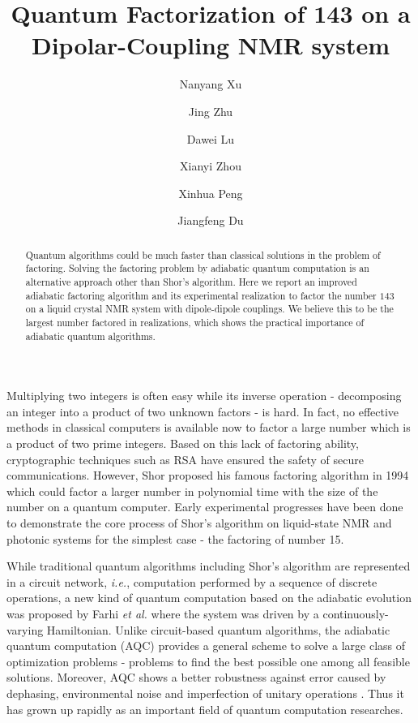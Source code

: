 \documentclass[twocolumn,showpacs,twoside,10pt,prl]{revtex4}
\begin{document}
\title{Quantum Factorization of 143 on a Dipolar-Coupling NMR system}
\author{Nanyang Xu}
\author{Jing Zhu}
\author{Dawei Lu}
\author{Xianyi Zhou}
\author{Xinhua Peng}
\author{Jiangfeng Du}
\begin{abstract}




Quantum algorithms could be much faster than classical solutions in
the problem of factoring. Solving the factoring problem by adiabatic
quantum computation is an alternative approach other than Shor's algorithm.
Here we report an improved adiabatic factoring algorithm and its
experimental realization to factor the number $143$ on a liquid
crystal NMR system with dipole-dipole couplings. We believe this to be the
largest number factored in realizations, which shows the practical
importance of adiabatic quantum algorithms.







\end{abstract}

\maketitle



Multiplying two integers is often easy while its inverse operation -
decomposing an integer into a product of two unknown factors - is
hard. In fact, no effective methods in classical computers is
available now to factor a large number which is a product of two
prime integers\cite{Knuth}. Based on this lack of factoring ability,
cryptographic techniques such as RSA have ensured the safety of
secure communications\cite{Koblitz}. However, Shor proposed his
famous factoring algorithm\cite{Shor_algorithm} in 1994 which could
factor a larger number in polynomial time with the size of the
number on a quantum computer. Early experimental progresses have been
done to demonstrate the core process of Shor's algorithm on liquid-state
NMR\cite{Chuang} and photonic systems\cite{Luchaoyang,Lanyon} for
the simplest case - the factoring of number 15.


While traditional quantum algorithms including Shor's algorithm are
represented in a circuit network, \emph{i.e.}, computation performed
by a sequence of discrete operations, a new kind of quantum
computation based on the adiabatic evolution was proposed by Farhi
\emph{et al.} \cite{Farhi} where the system was driven by a
continuously-varying Hamiltonian. Unlike circuit-based quantum algorithms, the adiabatic quantum
computation (AQC) provides a general scheme to solve a large class of
optimization problems - problems to find the best possible one
among all feasible solutions. Moreover, AQC shows a better robustness
against error caused by dephasing, environmental noise and
imperfection of unitary operations \cite{Childs_2002,Roland_robust}.
Thus it has grown up rapidly as an important field of quantum
computation researches.
\end{document}
